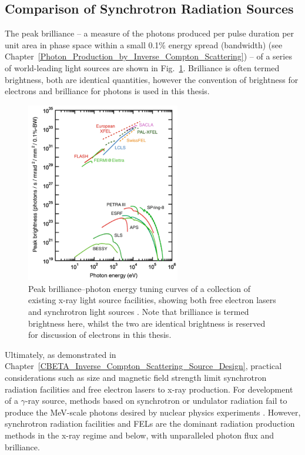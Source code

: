 \documentclass[../main.tex]{subfiles}
\begin{document}
\subsection{Comparison of Synchrotron Radiation Sources}

The peak brilliance -- a measure of the photons produced per pulse duration per unit area in phase space within a small 0.1\% energy spread (bandwidth) (see Chapter~\ref{Photon_Production_by_Inverse_Compton_Scattering}) -- of a series of world-leading light sources are shown in Fig.~\ref{fig:light_source_tuning_curves}. Brilliance is often termed brightness, both are identical quantities, however the convention of brightness for electrons and brilliance for photons is used in this thesis. 

\begin{figure}[!h]
\centering
\includegraphics[width=0.6\textwidth]{Figures/Introduction/Light_Source_Brilliance_Energy.pdf}
\caption{Peak brilliance--photon energy tuning curves of a collection of existing x-ray light source facilities, showing both free electron lasers and synchrotron light sources \cite{geloni2017physics}. Note that brilliance is termed brightness here, whilst the two are identical brightness is reserved for discussion of electrons in this thesis.}
\label{fig:light_source_tuning_curves}
\end{figure}

Ultimately, as demonstrated in Chapter~\ref{CBETA_Inverse_Compton_Scattering_Source_Design}, practical considerations such as size and magnetic field strength limit synchrotron radiation facilities and free electron lasers to x-ray production. For development of a $\gamma$-ray source, methods based on synchrotron or undulator radiation fail to produce the \si{\mega\electronvolt}-scale photons desired by nuclear physics experiments \cite{budker2021expanding}. However, synchrotron radiation facilities and FELs are the dominant radiation production methods in the x-ray regime and below, with unparalleled photon flux and brilliance.  
\end{document}
